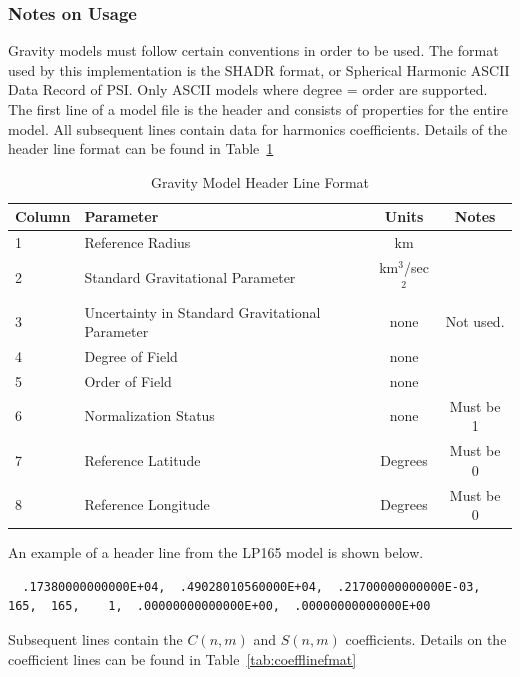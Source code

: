 \documentclass[Orbiter Technical Reference.tex]{subfiles}
\begin{document}
\subsubsection{Notes on Usage}
Gravity models must follow certain conventions in order to be used. The format used by this implementation is the SHADR format, or Spherical Harmonic ASCII Data Record of PSI\cite{shadr}. Only ASCII models where degree = order are supported.
The first line of a model file is the header and consists of properties for the entire model. All subsequent lines contain data for harmonics coefficients. Details of the header line format can be found in Table~\ref{tab:headlinefmat}
\begin{table}[h]
\begin{tabular}{llcc}
Column	&Parameter                        				&Units      			& Notes     \\\hline
1		&Reference Radius                 				&km         			&           \\
2		&Standard Gravitational Parameter 			&km$^3$/sec$^2$ 	&           \\
3		&Uncertainty in Standard Gravitational Parameter	&none           		& Not used. \\
4		&Degree of Field						&none           		&		\\
5		&Order of Field						&none				&		\\
6		&Normalization Status					&none				&Must be 1	\\
7		&Reference Latitude					&Degrees			&Must be 0	\\
8		&Reference Longitude					&Degrees			&Must be 0	
\end{tabular}
\caption{Gravity Model Header Line Format}
\label{tab:headlinefmat}
\end{table}


An example of a header line from the LP165 model is shown below.
\begin{tiny}
\begin{verbatim}
  .17380000000000E+04,  .49028010560000E+04,  .21700000000000E-03,  165,  165,    1,  .00000000000000E+00,  .00000000000000E+00   
\end{verbatim}
\end{tiny}

Subsequent lines contain the $C(n,m)$ and $S(n,m)$ coefficients. Details on the coefficient lines can be found in Table~\ref{tab:coefflinefmat}
\end{document}
